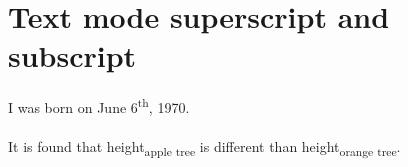 \documentclass[a4paper,12pt]{article}
\begin{document}
	\section*{Text mode superscript and subscript}
	I was born on June 6\textsuperscript{th}, 1970. \\ \\

	It is found that height\textsubscript{apple tree} is
	different than height\textsubscript{orange tree}. \\
		
\end{document}
